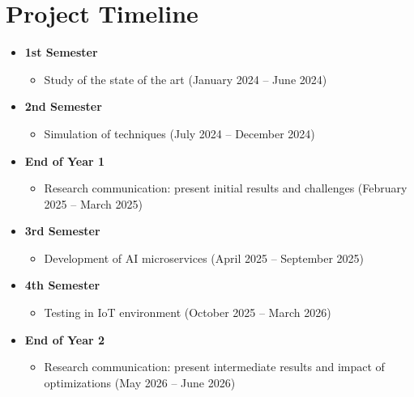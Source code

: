 \documentclass[tikz]{beamer}
\begin{document}
\section{Project Timeline}
\begin{frame}
    \begin{itemize}
        \item \textbf{1st Semester}
        \begin{itemize}
        \item Study of the state of the art (January 2024 – June 2024)
        \end{itemize}

        \item \textbf{2nd Semester}
        \begin{itemize}
        \item Simulation of techniques (July 2024 – December 2024)
        \end{itemize}

        \item \textbf{End of Year 1}
        \begin{itemize}
        \item Research communication: present initial results and challenges (February 2025 – March 2025)
        \end{itemize}
    \end{itemize}

\end{frame}

\begin{frame}
    \begin{itemize}
        \item \textbf{3rd Semester}
        \begin{itemize}
        \item Development of AI microservices (April 2025 – September 2025)
        \end{itemize}

        \item \textbf{4th Semester}
        \begin{itemize}
        \item Testing in IoT environment (October 2025 – March 2026)
        \end{itemize}

        \item \textbf{End of Year 2}
        \begin{itemize}
        \item Research communication: present intermediate results and impact of optimizations (May 2026 – June 2026)
        \end{itemize}
    \end{itemize}
\end{frame}
\end{document}
